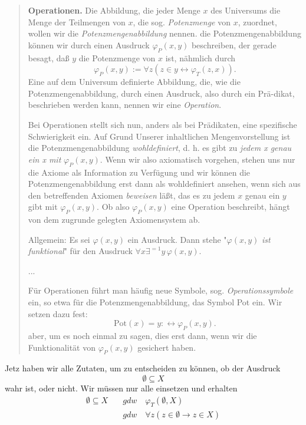 \documentclass[11pt, a4paper]{article}
\begin{document}
\begin{quote}
    \textbf{Operationen.} Die Abbildung, die jeder Menge $x$ des Universums
    die Menge der Teilmengen von $x$, die sog. \textit{Potenzmenge} von $x$,
    zuordnet, wollen wir die \textit{Potenzmengenabbildung} nennen. die
    Potenzmengenabbildung können wir durch einen Ausdruck $\varphi_P(x,y)$
    beschreiben, der gerade besagt, daß $y$ die Potenzmenge von $x$ ist,
    nähmlich durch
    \[
        \varphi_P(x,y) := \forall z(z\in y\leftrightarrow\varphi_T(z, x)).
    \]
    Eine auf dem Universum definierte Abbildung, die, wie die
    Potenzmengenabbildung, durch einen Ausdruck, also durch ein Prä-dikat,
    beschrieben werden kann, nennen wir eine \textit{Operation}.

    Bei Operationen stellt sich nun, anders als bei Prädikaten, eine
    spezifische Schwierigkeit ein. Auf Grund Unserer inhaltlichen
    Mengenvorstellung ist die Potenzmengenabbildung \textit{wohldefiniert}, d.
    h. es gibt zu \textit{jedem x genau ein x mit} $\varphi_P(x,y)$. Wenn wir
    also axiomatisch vorgehen, stehen uns nur die Axiome als Information zu
    Verfügung und wir können die Potenzmengenabbildung erst dann als
    wohldefiniert ansehen, wenn sich aus den betreffenden Axiomen
    \textit{beweisen} läßt, das es zu jedem $x$ genau ein $y$ gibt mit
    $\varphi_P(x,y)$. Ob also $\varphi_P(x,y)$ eine Operation beschreibt,
    hängt von dem zugrunde gelegten Axiomensystem ab.

    Allgemein: Es sei $\varphi(x,y)$ ein Ausdruck. Dann stehe "$\varphi(x,y)$
    \textit{ist funktional}" für den Ausdruck $\forall x\exists^{=1}y\,
    \varphi(x,y)$.
    
    ...

    Für Operationen führt man häufig neue Symbole, sog.
    \textit{Operationssymbole} ein, so etwa für die Potenzmengenabbildung, das
    Symbol Pot ein. Wir setzen dazu fest:
    \[
        \textrm{Pot}(x) = y :\leftrightarrow\varphi_P(x,y).
    \]
    aber, um es noch einmal zu sagen, dies erst dann, wenn wir die
    Funktionalität von $\varphi_P(x,y)$ gesichert haben.
\end{quote}


Jetz haben wir alle Zutaten, um zu entscheiden zu können, ob der
Ausdruck
\[
    \emptyset \subseteq X
\]
wahr ist, oder nicht. Wir müssen nur alle einsetzen und erhalten
\begin{equation}
\begin{split}
    \emptyset \subseteq X & \quad gdw\quad \varphi_T(\emptyset, X) \\ 
     & \quad gdw\quad\forall z(z\in \emptyset \rightarrow z\in X)
\end{split}
\end{equation}

\newpage


\end{document}
